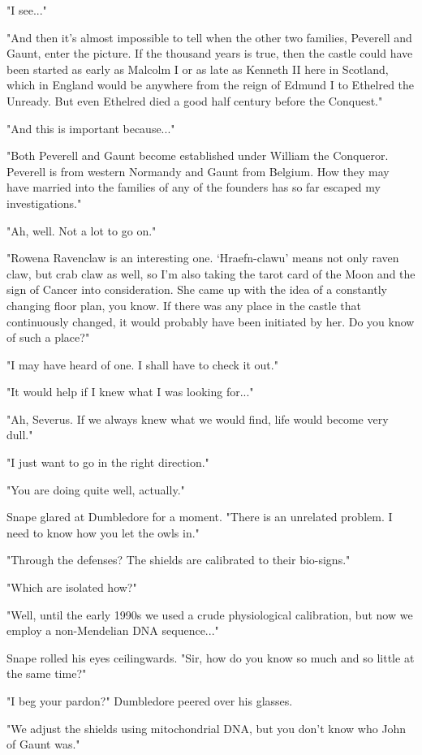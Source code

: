 \documentclass[a4paper,11pt]{article}
\begin{document}
"I see..."

"And then it's almost impossible to tell when the other two families, Peverell and Gaunt, enter the picture. If the thousand years is true, then the castle could have been started as early as Malcolm I or as late as Kenneth II here in Scotland, which in England would be anywhere from the reign of Edmund I to Ethelred the Unready. But even Ethelred died a good half century before the Conquest."

"And this is important because..."

"Both Peverell and Gaunt become established under William the Conqueror. Peverell is from western Normandy and Gaunt from Belgium. How they may have married into the families of any of the founders has so far escaped my investigations."

"Ah, well. Not a lot to go on."

"Rowena Ravenclaw is an interesting one. `Hraefn-clawu' means not only raven claw, but crab claw as well, so I'm also taking the tarot card of the Moon and the sign of Cancer into consideration. She came up with the idea of a constantly changing floor plan, you know. If there was any place in the castle that continuously changed, it would probably have been initiated by her. Do you know of such a place?"

"I may have heard of one. I shall have to check it out."

"It would help if I knew what I was looking for..."

"Ah, Severus. If we always knew what we would find, life would become very dull."

"I just want to go in the right direction."

"You are doing quite well, actually."

Snape glared at Dumbledore for a moment. "There is an unrelated problem. I need to know how you let the owls in."

"Through the defenses? The shields are calibrated to their bio-signs."

"Which are isolated how?"

"Well, until the early 1990s we used a crude physiological calibration, but now we employ a non-Mendelian DNA sequence..."

Snape rolled his eyes ceilingwards. "Sir, how do you know so much and so little at the same time?"

"I beg your pardon?" Dumbledore peered over his glasses.

"We adjust the shields using mitochondrial DNA, but you don't know who John of Gaunt was."
\end{document}
